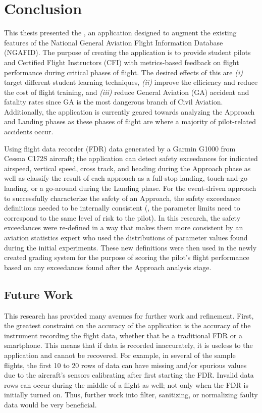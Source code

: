 
\chapter{Conclusion} \label{ch:conclusion}
	
	This thesis presented the \toolname, an application designed to augment the existing features of the National General Aviation Flight Information Database (NGAFID).  The purpose of creating the application is to provide student pilots and Certified Flight Instructors (CFI) with metrics-based feedback on flight performance during critical phases of flight.  The desired effects of this are \textit{(i)} target different student learning techniques, \textit{(ii)} improve the efficiency and reduce the cost of flight training, and \textit{(iii)} reduce General Aviation (GA) accident and fatality rates since GA is the most dangerous branch of Civil Aviation.  Additionally, the application is currently geared towards analyzing the Approach and Landing phases as these phases of flight are where a majority of pilot-related accidents occur.
	
	Using flight data recorder (FDR) data generated by a Garmin G1000 from Cessna C172S aircraft; the application can detect safety exceedances for indicated airspeed, vertical speed, cross track, and heading during the Approach phase as well as classify the result of each approach as a full-stop landing, touch-and-go landing, or a go-around during the Landing phase.  For the event-driven approach to successfully characterize the safety of an Approach, the safety exceedance definitions needed to be internally consistent (\ie, the parameter limits need to correspond to the same level of risk to the pilot).  In this research, the safety exceedances were re-defined in a way that makes them more consistent by an aviation statistics expert who used the distributions of parameter values found during the initial experiments.  These new definitions were then used in the newly created grading system for the purpose of scoring the pilot's flight performance based on any exceedances found after the Approach analysis stage.
	


\section{Future Work} \label{sec:future_work}

	This research has provided many avenues for further work and refinement.  First, the greatest constraint on the accuracy of the application is the accuracy of the instrument recording the flight data, whether that be a traditional FDR or a smartphone.  This means that if data is recorded inaccurately, it is useless to the application and cannot be recovered.  For example, in several of the sample flights, the first 10 to 20 rows of data can have missing and/or spurious values due to the aircraft's sensors calibrating after first starting the FDR.  Invalid data rows can occur during the middle of a flight as well; not only when the FDR is initially turned on.  Thus, further work into filter, sanitizing, or normalizing faulty data would be very beneficial.
	
